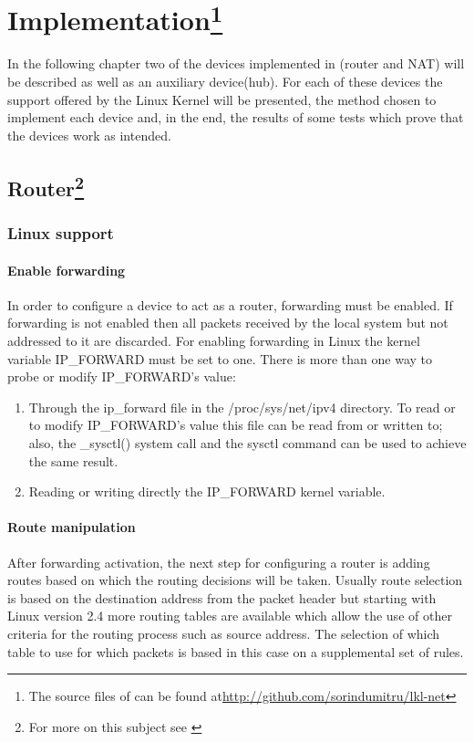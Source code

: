 \chapter[Implementation]{Implementation\footnote{The source files of \project can be found at\url{http://github.com/sorindumitru/lkl-net}}}
\label{chapter:impl}
In the following chapter two of the devices implemented in \project(router and NAT) will be described as well as an auxiliary device(hub). For each of these devices the support offered by the Linux Kernel will be presented, the method chosen to implement each device and, in the end, the results of some tests which prove that the devices work as intended.

\section[Router]{Router\footnote{For more on this subject see \cite{linnetarch}}}
\label{sec:router-impl}

\subsection{Linux support}
\label{sub-sec:router-linux}

\subsubsection{Enable forwarding}
In order to configure a device to act as a router, forwarding must be enabled. If forwarding is not enabled then all packets received by the local system but not addressed to it are discarded. 
For enabling forwarding in Linux the kernel variable IP_FORWARD must be set to one. There is more than one way to probe or modify IP_FORWARD's value:
\renewcommand{\theenumi}{\alph{enumi}}
\begin{enumerate}
\item Through the ip_forward file in the /proc/sys/net/ipv4 directory. To read or to modify IP_FORWARD's value this file can be read from or written to; also, the _sysctl() system call and the sysctl command can be used to achieve the same result. 
\item Reading or writing directly the IP_FORWARD kernel variable. 
\end{enumerate}
\renewcommand{\theenumi}{\arabic{enumi}}

\subsubsection{Route manipulation}
After forwarding activation, the next step for configuring a router is adding routes based on which the routing decisions will be taken. Usually route selection is based on the destination address from the packet header but starting with Linux version 2.4 more routing tables are available which allow the use of other criteria for the routing process such as source address. The selection of which table to use for which packets is based in this case on a supplemental set of rules.

